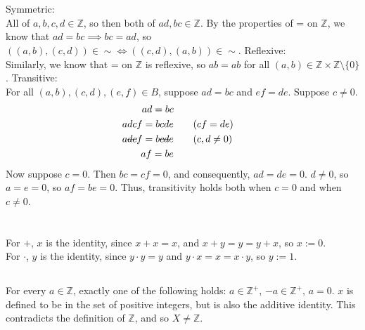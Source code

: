 \documentclass{article}
\begin{document}
\section{} %
Symmetric:\\
All of $a,b,c,d\in\mathbb{Z}$, so then both of $ad,bc\in\mathbb{Z}$. By the
properties of = on $\mathbb{Z}$, we know that $ad=bc\implies bc=ad$, so
$((a,b),(c,d))\in\sim\iff((c,d),(a,b))\in\sim$.
\newline
\newline
Reflexive:\\
Similarly, we know that = on $\mathbb{Z}$ is reflexive, so
$ab=ab$ for all $(a,b)\in\mathbb{Z}\times\mathbb{Z}\setminus\{0\}$.
\newline
\newline
Transitive:\\
For all $(a,b),(c,d),(e,f)\in B$, suppose $ad=bc$ and $ef=de$.
Suppose $c\neq0$.
\begin{align*}
	ad=bc\\
	adcf=bcde&\qquad\text{($cf=de$)}\\
	a\msout{dc}f=b\msout{cd}e&\qquad\text{($c,d\neq0$)}\\
	af=be
\end{align*}
Now suppose $c=0$. Then $bc=cf=0$, and consequently, $ad=de=0$. $d\neq0$, so
$a=e=0$, so $af=be=0$. Thus, transitivity holds both when $c=0$ and when
$c\neq0$.
\section{} %
\subsection{} %
For $+$, $x$ is the identity, since $x+x=x$, and $x+y=y=y+x$, so $x:=0$.\\
For $\cdot$, $y$ is the identity, since $y\cdot y=y$ and $y\cdot x=x=x\cdot y$,
so $y:=1$.
\subsection{} %
For every $a\in\mathbb{Z}$, exactly one of the following holds: $a\in\mathbb{Z}^+$,
$-a\in\mathbb{Z}^+$, $a=0$. $x$ is defined to be in the set of positive integers,
but is also the additive identity. This contradicts the definition of $\mathbb{Z}$,
and so $X\neq\mathbb{Z}$.
\section{} %
\end{document}
